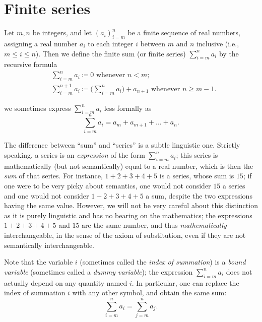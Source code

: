 \section{Finite series}\label{i:sec:7.1}

\begin{defn}\label{i:7.1.1}
  Let \(m, n\) be integers, and let \((a_i)_{i = m}^n\) be a finite sequence of real numbers, assigning a real number \(a_i\) to each integer \(i\) between \(m\) and \(n\) inclusive (i.e., \(m \leq i \leq n\)).
  Then we define the finite sum (or finite series) \(\sum_{i = m}^n a_i\) by the recursive formula
  \begin{align*}
     & \sum_{i = m}^n a_i \coloneqq 0 \text{ whenever } n < m ;                                                      \\
     & \sum_{i = m}^{n + 1} a_i \coloneqq \Bigg(\sum_{i = m}^n a_i\Bigg) + a_{n + 1} \text{ whenever } n \geq m - 1.
  \end{align*}
\end{defn}

\begin{note}
  we sometimes express \(\sum_{i = m}^n a_i\) less formally as
  \[
    \sum_{i = m}^n a_i = a_m + a_{m + 1} + \dots + a_n.
  \]
\end{note}

\begin{rmk}\label{i:7.1.2}
  The difference between ``sum'' and ``series'' is a subtle linguistic one.
  Strictly speaking, a series is an \emph{expression} of the form \(\sum_{i = m}^n a_i\);
  this series is mathematically (but not semantically) equal to a real number, which is then the \emph{sum} of that series.
  For instance, \(1 + 2 + 3 + 4 + 5\) is a series, whose sum is \(15\);
  if one were to be very picky about semantics, one would not consider \(15\) a series and one would not consider \(1 + 2 + 3 + 4 + 5\) a sum, despite the two expressions having the same value.
  However, we will not be very careful about this distinction as it is purely linguistic and has no bearing on the mathematics;
  the expressions \(1 + 2 + 3 + 4 + 5\) and \(15\) are the same number, and thus \emph{mathematically} interchangeable, in the sense of the axiom of substitution, even if they are not semantically interchangeable.
\end{rmk}

\begin{rmk}\label{i:7.1.3}
  Note that the variable \(i\) (sometimes called the \emph{index of summation}) is a \emph{bound variable} (sometimes called a \emph{dummy variable});
  the expression \(\sum_{i = m}^n a_i\) does not actually depend on any quantity named \(i\).
  In particular, one can replace the index of summation \(i\) with any other symbol, and obtain the same sum:
  \[
    \sum_{i = m}^n a_i = \sum_{j = m}^n a_j.
  \]
\end{rmk}

